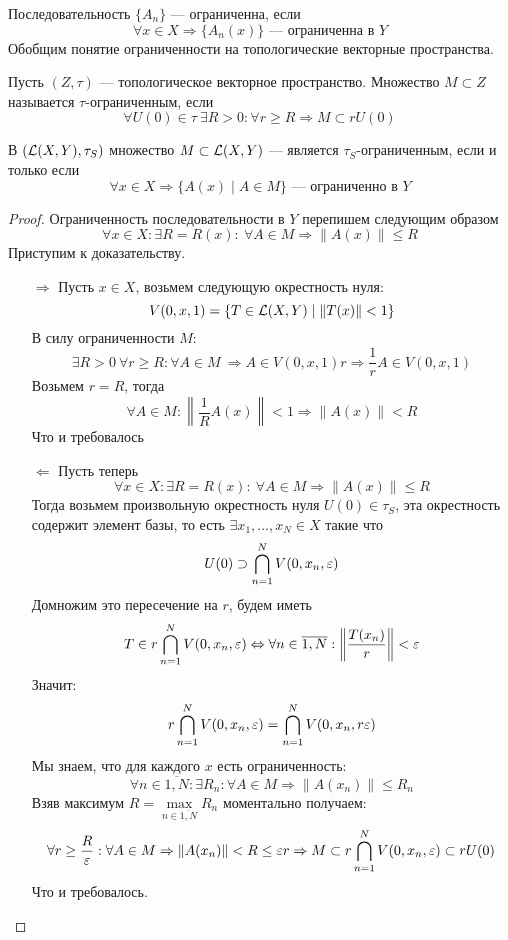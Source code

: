 Последовательность $\{A_n\}$ --- ограниченна, если
$$
\forall x \in X \Rightarrow \{A_n(x)\} \text{ --- ограниченна в $Y$}
$$
Обобщим понятие ограниченности на топологические векторные пространства. 
\begin{definition}
	Пусть $(Z, \tau)$ --- топологическое векторное пространство. Множество $M \subset Z$ называется $\tau$-ограниченным, если 
	$$
	\forall U(0) \in \tau \  \exists R > 0: \forall r  \geq R \Rightarrow M \subset r U(0)
	$$
\end{definition}
\begin{claim}
	В $(\mathcal{L}(X, Y), \tau_S)$ множество $M \subset \mathcal{L}(X, Y)$ --- является $\tau_S$-ограниченным, если и только если
	$$
	\forall x \in X \Rightarrow \{A(x) \mid A \in M \} \text{ --- ограниченно в $Y$}
	$$
\end{claim}
\begin{proof}
	Ограниченность последовательности в $Y$ перепишем следующим образом
	$$
	\forall x \in X: \exists R = R(x): \ \forall A \in M \Rightarrow \|A(x)\| \leq R
	$$
	Приступим к доказательству.
	\begin{enumerate}
		\item[$\Rightarrow$] Пусть $x\in X$, возьмем следующую окрестность нуля:
		$$
		V(0,x,1) = \{T \in \mathcal{L}(X, Y) \mid \|T(x)\| < 1\}
		$$
		В силу ограниченности $M$: 
		$$
		\exists R > 0 \ \forall r \geq R: \forall A \in M \ \Rightarrow A \in V(0,x,1)r \Rightarrow \frac{1}{r}A \in V(0,x,1)
		$$
		Возьмем $r = R$, тогда
		$$
		\forall A \in M \colon \left\|\frac{1}{R}A(x)\right\| < 1 \Rightarrow \|A(x)\| < R
		$$
		Что и требовалось 
		\item[$\Leftarrow$] Пусть теперь 
		$$
		\forall x \in X: \exists R = R(x): \ \forall A \in M \Rightarrow \|A(x)\| \leq R
		$$
		Тогда возьмем произвольную окрестность нуля $U(0) \in \tau_S$, эта окрестность содержит элемент базы, то есть $\exists x_1, \dots, x_N \in X$ такие что
		$$
		U(0) \supset \bigcap_{n =1}^N V(0, x_n, \varepsilon )
		$$
		Домножим это пересечение на $r$, будем иметь
		$$
		T \in r\bigcap_{n =1}^N V(0, x_n, \varepsilon ) \Leftrightarrow \forall n \in \overline{1, N}: \left\|\frac{T(x_n)}{r}\right\| < \varepsilon 
		$$
		Значит:
		$$
		r\bigcap_{n =1}^N V(0, x_n, \varepsilon ) = \bigcap_{n =1}^N V(0, x_n, r\varepsilon )
		$$
		Мы знаем, что для каждого $x$ есть ограниченность:
		$$
		\forall n \in \overline{1, N}: \exists R_n : \forall A \in M \Rightarrow\|A(x_n)\| \leq R_n
		$$
		Взяв максимум $R = \max\limits_{n \in \overline{1,N}}R_n$ моментально получаем:
		$$
		\forall r \geq \frac{R}{\varepsilon}: \forall A \in M \Rightarrow \|A(x_n)\| < R \leq \varepsilon r  \Rightarrow M \subset r\bigcap_{n =1}^N V(0, x_n, \varepsilon ) \subset rU(0)
		$$
		Что и требовалось.
	\end{enumerate}
\end{proof}
